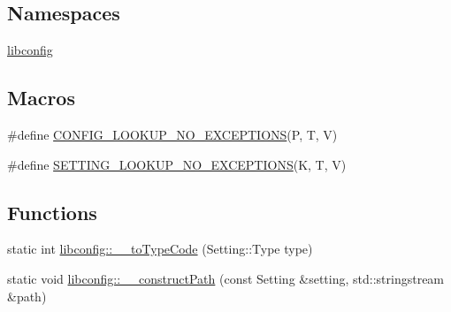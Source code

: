 \subsection*{Namespaces}
\begin{DoxyCompactItemize}
\item 
\hyperlink{namespacelibconfig}{libconfig}
\end{DoxyCompactItemize}
\subsection*{Macros}
\begin{DoxyCompactItemize}
\item 
\#define \hyperlink{libconfigcpp_8c_09_09_aac782925c90a12a08457aa1e9eec31bd}{C\-O\-N\-F\-I\-G\-\_\-\-L\-O\-O\-K\-U\-P\-\_\-\-N\-O\-\_\-\-E\-X\-C\-E\-P\-T\-I\-O\-N\-S}(P, T, V)
\item 
\#define \hyperlink{libconfigcpp_8c_09_09_abfd54db12d50ab5a5811407b035c743b}{S\-E\-T\-T\-I\-N\-G\-\_\-\-L\-O\-O\-K\-U\-P\-\_\-\-N\-O\-\_\-\-E\-X\-C\-E\-P\-T\-I\-O\-N\-S}(K, T, V)
\end{DoxyCompactItemize}
\subsection*{Functions}
\begin{DoxyCompactItemize}
\item 
static int \hyperlink{namespacelibconfig_a8e110477bf88dac91c60df3cc4e7eebe}{libconfig\-::\-\_\-\-\_\-to\-Type\-Code} (Setting\-::\-Type type)
\item 
static void \hyperlink{namespacelibconfig_ac6ddf54284dd0e8344d0e64a61cf9f17}{libconfig\-::\-\_\-\-\_\-construct\-Path} (const Setting \&setting, std\-::stringstream \&path)
\end{DoxyCompactItemize}


